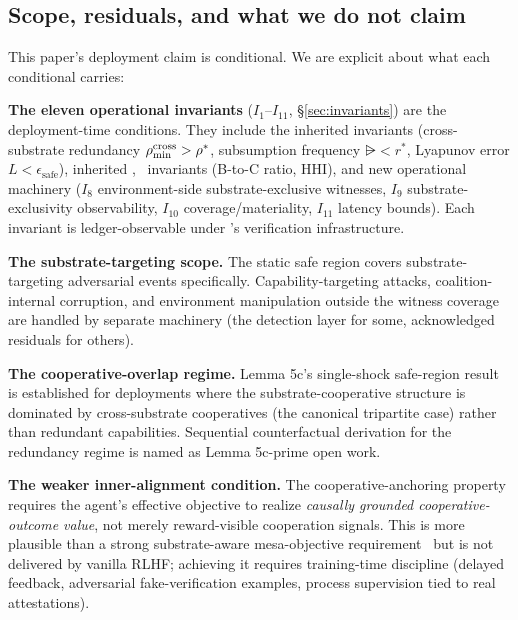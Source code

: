 \subsection{Scope, residuals, and what we do not claim}
\label{sec:scope}

This paper's deployment claim is conditional. We are explicit about what each
conditional carries:

\textbf{The eleven operational invariants} ($I_1$--$I_{11}$,
\S\ref{sec:invariants}) are the deployment-time conditions. They include the
inherited \citep[Phase~Redundancy]{lasser2026phase} invariants (cross-substrate
redundancy $\rho_{\min}^{\mathrm{cross}} > \rho^*$, subsumption frequency $\rsub < r^*$,
Lyapunov error $L < \epsilon_{\mathrm{safe}}$), inherited
\citep[Revealed~Sacrifice]{lasser2026paper8a},~\citep[Need~Sufficiency]{lasser2026paper8b}
invariants (B-to-C ratio, HHI), and new operational machinery ($I_8$
environment-side substrate-exclusive witnesses, $I_9$ substrate-exclusivity
observability, $I_{10}$ coverage/materiality, $I_{11}$ latency bounds). Each
invariant is ledger-observable under
\citep[Exogenous~Verification]{lasser2026exo}'s verification infrastructure.

\textbf{The substrate-targeting scope.} The static safe region covers
substrate-targeting adversarial events specifically. Capability-targeting
attacks, coalition-internal corruption, and environment manipulation outside
the witness coverage are handled by separate machinery (the detection layer for
some, acknowledged residuals for others).

\textbf{The cooperative-overlap regime.} Lemma 5c's single-shock safe-region
result is established for deployments where the substrate-cooperative
structure is dominated by cross-substrate cooperatives (the canonical
tripartite case) rather than redundant capabilities. Sequential
counterfactual derivation for the redundancy regime is named as Lemma
5c-prime open work.

\textbf{The weaker inner-alignment condition.} The cooperative-anchoring
property requires the agent's effective objective to realize \emph{causally
grounded cooperative-outcome value}, not merely reward-visible cooperation
signals. This is more plausible than a strong substrate-aware mesa-objective
requirement~\citep{hubinger2019risks} but is not delivered by vanilla RLHF;
achieving it requires training-time discipline (delayed feedback, adversarial
fake-verification
examples, process supervision tied to real attestations).


